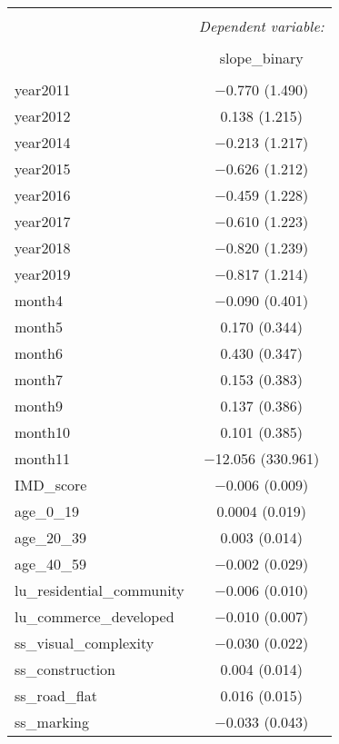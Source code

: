 \begin{table}[!htbp] \centering 
  \caption{} 
  \label{} 
\small 
\begin{tabular}{@{\extracolsep{1pt}}lc} 
\\[-1.8ex]\hline 
\hline \\[-1.8ex] 
 & \multicolumn{1}{c}{\textit{Dependent variable:}} \\ 
\cline{2-2} 
\\[-1.8ex] & slope\_binary \\ 
\hline \\[-1.8ex] 
 year2011 & $-$0.770 (1.490) \\ 
  year2012 & 0.138 (1.215) \\ 
  year2014 & $-$0.213 (1.217) \\ 
  year2015 & $-$0.626 (1.212) \\ 
  year2016 & $-$0.459 (1.228) \\ 
  year2017 & $-$0.610 (1.223) \\ 
  year2018 & $-$0.820 (1.239) \\ 
  year2019 & $-$0.817 (1.214) \\ 
  month4 & $-$0.090 (0.401) \\ 
  month5 & 0.170 (0.344) \\ 
  month6 & 0.430 (0.347) \\ 
  month7 & 0.153 (0.383) \\ 
  month9 & 0.137 (0.386) \\ 
  month10 & 0.101 (0.385) \\ 
  month11 & $-$12.056 (330.961) \\ 
  IMD\_score & $-$0.006 (0.009) \\ 
  age\_0\_19 & 0.0004 (0.019) \\ 
  age\_20\_39 & 0.003 (0.014) \\ 
  age\_40\_59 & $-$0.002 (0.029) \\ 
  lu\_residential\_community & $-$0.006 (0.010) \\ 
  lu\_commerce\_developed & $-$0.010 (0.007) \\ 
  ss\_visual\_complexity & $-$0.030 (0.022) \\ 
  ss\_construction & 0.004 (0.014) \\ 
  ss\_road\_flat & 0.016 (0.015) \\ 
  ss\_marking & $-$0.033 (0.043) \\ 

\end{tabular}
\end{table}
